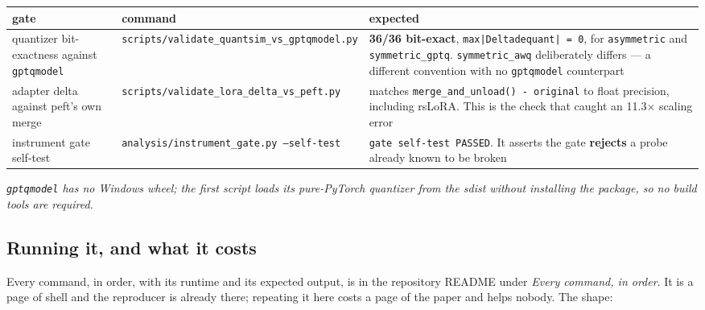 \begin{table}[t]
\centering\scriptsize
\begin{tabularx}{\textwidth}{>{\hsize=0.508\hsize\raggedright\arraybackslash}X>{\hsize=0.508\hsize\raggedright\arraybackslash}X>{\hsize=1.984\hsize\raggedright\arraybackslash}X}
\toprule
gate & command & expected \\
\midrule
quantizer bit-exactness against \texttt{gptqmodel} & \texttt{scripts/\allowbreak{}validate\_\allowbreak{}quantsim\_\allowbreak{}vs\_\allowbreak{}gptqmodel.\allowbreak{}py} & \textbf{36/36 bit-exact}, \texttt{max|Deltadequant| = 0}, for \texttt{asymmetric} and \texttt{symmetric\_\allowbreak{}gptq}. \texttt{symmetric\_\allowbreak{}awq} deliberately differs --- a different convention with no \texttt{gptqmodel} counterpart \\
adapter delta against peft's own merge & \texttt{scripts/\allowbreak{}validate\_\allowbreak{}lora\_\allowbreak{}delta\_\allowbreak{}vs\_\allowbreak{}peft.\allowbreak{}py} & matches \texttt{merge\_\allowbreak{}and\_\allowbreak{}unload() - original} to float precision, including rsLoRA. This is the check that caught an 11.3$\times$ scaling error \\
instrument gate self-test & \texttt{analysis/\allowbreak{}instrument\_\allowbreak{}gate.\allowbreak{}py --\allowbreak{}self-\allowbreak{}test} & \texttt{gate self-\allowbreak{}test PASSED}. It asserts the gate \textbf{rejects} a probe already known to be broken \\
\bottomrule
\end{tabularx}
\end{table}

\emph{\texttt{gptqmodel} has no Windows wheel; the first script loads its pure-PyTorch quantizer from the sdist without installing the package, so no build tools are required.}

\subsection{Running it, and what it costs}

Every command, in order, with its runtime and its expected output, is in the repository README under \emph{Every command, in order}. It is a page of shell and the reproducer is already there; repeating it here costs a page of the paper and helps nobody. The shape:

